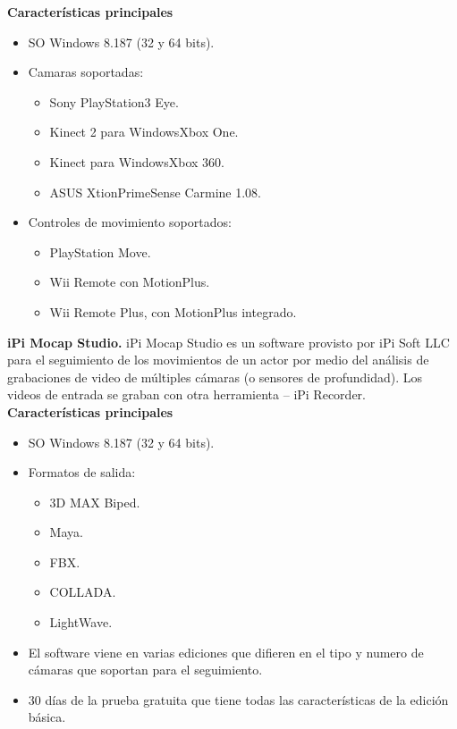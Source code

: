 \textbf{Características principales}

\begin{itemize} \itemsep1pt \parskip0pt 
	\item SO Windows 8.1\/8\/7 (32 y 64 bits). 
	\item Camaras soportadas: 
	\begin{itemize} \itemsep1pt \parskip0pt 
		\item Sony PlayStation3 Eye.
		\item Kinect 2 para Windows\/Xbox One.
		\item Kinect para Windows\/Xbox 360.
		\item ASUS Xtion\/PrimeSense Carmine 1.08.
	\end{itemize}
	\item Controles de movimiento soportados:
	\begin{itemize} \itemsep1pt \parskip0pt 
		\item PlayStation Move.
		\item Wii Remote con MotionPlus.
		\item Wii Remote Plus, con MotionPlus integrado.
	\end{itemize}
\end{itemize}

\textbf{iPi Mocap Studio.} iPi Mocap Studio es un software provisto por iPi Soft LLC para el seguimiento de los movimientos de un actor por medio del análisis de grabaciones de video de múltiples cámaras (o sensores de profundidad). Los videos de entrada se graban con otra herramienta – iPi Recorder. \cite{iPi}\\

\textbf{Características principales}

\begin{itemize} \itemsep1pt \parskip0pt 
	\item SO Windows 8.1\/8\/7 (32 y 64 bits). 
	\item Formatos de salida: 
	\begin{itemize} \itemsep1pt \parskip0pt 
		\item 3D MAX Biped.
		\item Maya.
		\item FBX.
		\item COLLADA.
		\item LightWave.
	\end{itemize}
	\item El software viene en varias ediciones que difieren en el tipo y numero de cámaras que soportan para el seguimiento.
	\item 30 días de la prueba gratuita que tiene todas las características de la edición básica.
\end{itemize}

